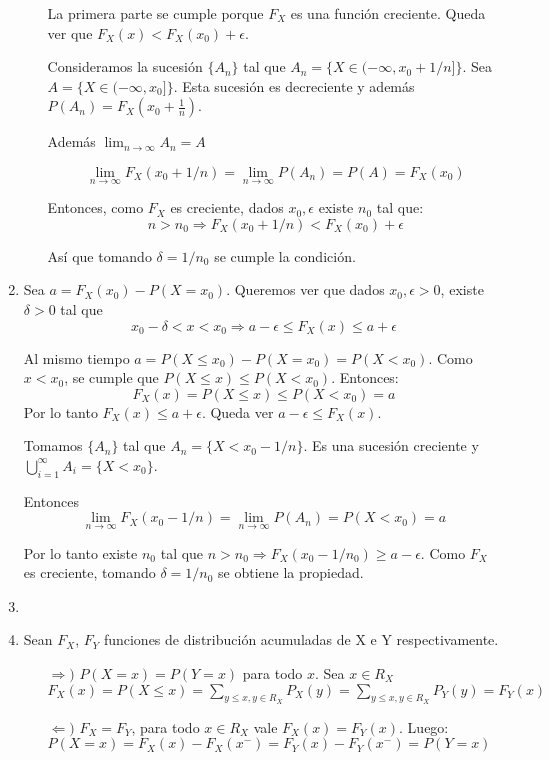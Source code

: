 \begin{enumerate}
\begin{enumerate}
					La primera parte se cumple porque $F_X$ es una función creciente. Queda ver que $F_X(x) < F_X(x_0) + \epsilon$.
					
					Consideramos la sucesión $\{A_n\}$ tal que $A_n = \{X \in (-\infty, x_0 + 1/n]\}$. Sea $A = \{X \in (-\infty, x_0]\}$.
					Esta sucesión es decreciente y además $P(A_n) = F_X(x_0+\frac{1}{n})$.
					
					Además $\lim_{n\rightarrow \infty}A_n = A$
					
					$$\lim_{n\rightarrow \infty}F_X(x_0 + 1/n) = \lim_{n\rightarrow \infty}P(A_n) = P(A) = F_X(x_0)$$
					
					Entonces, como $F_X$ es creciente, dados $x_0, \epsilon$ existe $n_0$ tal que:
					$$n > n_0 \Rightarrow F_X(x_0 + 1/n) < F_X(x_0) + \epsilon$$
					
					Así que tomando $\delta = 1/n_0$ se cumple la condición.
			\end{enumerate}
	\item
		Sea $a = F_X(x_0) - P(X=x_0)$. Queremos ver que dados $x_0, \epsilon > 0$, existe $\delta > 0$ tal que
		$$x_0 - \delta < x < x_0 \Rightarrow a - \epsilon \leq F_X(x) \leq a + \epsilon$$
		
		Al mismo tiempo $a = P(X\leq x_0) - P(X=x_0) = P(X < x_0)$.
		Como $x < x_0$, se cumple que $P(X\leq x) \leq P(X<x_0)$. Entonces:
		$$F_X(x) = P(X\leq x) \leq P(X<x_0) = a$$
		Por lo tanto $F_X(x) \leq a + \epsilon$. Queda ver $a - \epsilon \leq F_X(x)$.
		
		Tomamos $\{A_n\}$ tal que $A_n=\{X < x_0-1/n\}$. Es una sucesión creciente y $\bigcup_{i=1}^{\infty}A_i = \{X<x_0\}$.
		
		Entonces $$\lim_{n\rightarrow\infty}F_X(x_0 - 1/n) = \lim_{n\rightarrow\infty}P(A_n) = P(X < x_0) = a$$
		
		Por lo tanto existe $n_0$ tal que $n>n_0\Rightarrow F_X(x_0 - 1/n_0) \geq a - \epsilon$.
		Como $F_X$ es creciente, tomando $\delta = 1/n_0$ se obtiene la propiedad. 
	\item
		
	\item
		
    Sean $F_X$, $F_Y$ funciones de distribución acumuladas de X e Y respectivamente.
    
    \begin{itemize}
      \item[$\Rightarrow)$] $P(X = x) = P(Y = x)$ para todo $x$. Sea $x \in R_X$ \\
                            $F_X(x) = P(X \leq x) = \sum_{y \leq x, y \in R_X }^{} P_X(y) =  \sum_{y \leq x, y \in R_X }^{} P_Y(y) = F_Y(x) $
      \item[$\Leftarrow)$]  $F_X = F_Y$, para todo $x \in R_X $ vale $F_X(x) = F_Y(x)$. Luego: \\
                            $P(X=x) = F_X(x) - F_X(x^{-}) = F_Y(x) - F_Y(x^{-}) = P(Y=x)$
    \end{itemize}
    

\end{enumerate}
